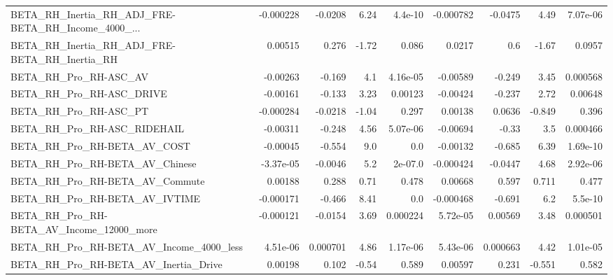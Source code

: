 \begin{tabular}{lrrrrrrrr}
BETA\_RH\_Inertia\_RH\_ADJ\_FRE-BETA\_RH\_Income\_4000\_... &   -0.000228 &      -0.0208 &     6.24 &  4.4e-10 &  -0.000782 &     -0.0475 &         4.49 &      7.07e-06 \\
BETA\_RH\_Inertia\_RH\_ADJ\_FRE-BETA\_RH\_Inertia\_RH      &     0.00515 &        0.276 &    -1.72 &    0.086 &     0.0217 &         0.6 &        -1.67 &        0.0957 \\
BETA\_RH\_Pro\_RH-ASC\_AV                              &    -0.00263 &       -0.169 &      4.1 & 4.16e-05 &   -0.00589 &      -0.249 &         3.45 &      0.000568 \\
BETA\_RH\_Pro\_RH-ASC\_DRIVE                           &    -0.00161 &       -0.133 &     3.23 &  0.00123 &   -0.00424 &      -0.237 &         2.72 &       0.00648 \\
BETA\_RH\_Pro\_RH-ASC\_PT                              &   -0.000284 &      -0.0218 &    -1.04 &    0.297 &    0.00138 &      0.0636 &       -0.849 &         0.396 \\
BETA\_RH\_Pro\_RH-ASC\_RIDEHAIL                        &    -0.00311 &       -0.248 &     4.56 & 5.07e-06 &   -0.00694 &       -0.33 &          3.5 &      0.000466 \\
BETA\_RH\_Pro\_RH-BETA\_AV\_COST                        &    -0.00045 &       -0.554 &      9.0 &      0.0 &   -0.00132 &      -0.685 &         6.39 &      1.69e-10 \\
BETA\_RH\_Pro\_RH-BETA\_AV\_Chinese                     &   -3.37e-05 &      -0.0046 &      5.2 &  2e-07.0 &  -0.000424 &     -0.0447 &         4.68 &      2.92e-06 \\
BETA\_RH\_Pro\_RH-BETA\_AV\_Commute                     &     0.00188 &        0.288 &     0.71 &    0.478 &    0.00668 &       0.597 &        0.711 &         0.477 \\
BETA\_RH\_Pro\_RH-BETA\_AV\_IVTIME                      &   -0.000171 &       -0.466 &     8.41 &      0.0 &  -0.000468 &      -0.691 &          6.2 &       5.5e-10 \\
BETA\_RH\_Pro\_RH-BETA\_AV\_Income\_12000\_more           &   -0.000121 &      -0.0154 &     3.69 & 0.000224 &   5.72e-05 &     0.00569 &         3.48 &      0.000501 \\
BETA\_RH\_Pro\_RH-BETA\_AV\_Income\_4000\_less            &    4.51e-06 &     0.000701 &     4.86 & 1.17e-06 &   5.43e-06 &    0.000663 &         4.42 &      1.01e-05 \\
BETA\_RH\_Pro\_RH-BETA\_AV\_Inertia\_Drive               &     0.00198 &        0.102 &    -0.54 &    0.589 &    0.00597 &       0.231 &       -0.551 &         0.582 \\

\end{tabular}
